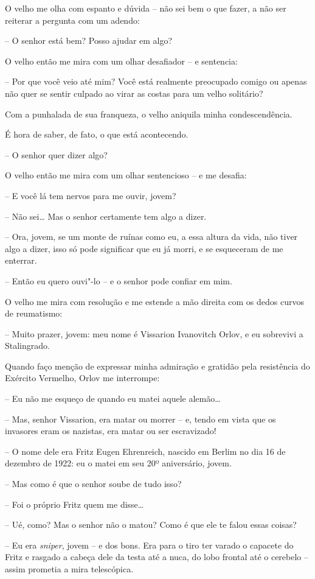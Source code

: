 O velho me olha com espanto e dúvida -- não sei bem o que fazer, a não
ser reiterar a pergunta com um adendo:

-- O senhor está bem? Posso ajudar em algo?

O velho então me mira com um olhar desafiador -- e sentencia:

-- Por que você veio até mim? Você está realmente preocupado comigo ou
apenas não quer se sentir culpado ao virar as costas para um velho
solitário?

Com a punhalada de sua franqueza, o velho aniquila minha
condescendência.

É hora de saber, de fato, o que está acontecendo.

-- O senhor quer dizer algo?

O velho então me mira com um olhar sentencioso -- e me desafia:

-- E você lá tem nervos para me ouvir, jovem?

-- Não sei\ldots{} Mas o senhor certamente tem algo a dizer.

-- Ora, jovem, se um monte de ruínas como eu, a essa altura da vida, não
tiver algo a dizer, isso só pode significar que eu já morri, e se
esqueceram de me enterrar.

-- Então eu quero ouvi"-lo -- e o senhor pode confiar em mim.

O velho me mira com resolução e me estende a mão direita com os dedos
curvos de reumatismo:

-- Muito prazer, jovem: meu nome é Vissarion Ivanovitch Orlov, e eu
sobrevivi a Stalingrado.

Quando faço menção de expressar minha admiração e gratidão pela
resistência do Exército Vermelho, Orlov me interrompe:

-- Eu não me esqueço de quando eu matei aquele alemão\ldots{}

-- Mas, senhor Vissarion, era matar ou morrer -- e, tendo em vista que
os invasores eram os nazistas, era matar ou ser escravizado!

-- O nome dele era Fritz Eugen Ehrenreich, nascido em Berlim no dia 16
de dezembro de 1922: eu o matei em seu 20º aniversário, jovem.

-- Mas como é que o senhor soube de tudo isso?

-- Foi o próprio Fritz quem me disse\ldots{}

-- Ué, como? Mas o senhor não o matou? Como é que ele te falou essas
coisas?

-- Eu era \emph{sniper}, jovem -- e dos bons. Era para o tiro ter varado
o capacete do Fritz e rasgado a cabeça dele da testa até a nuca, do lobo
frontal até o cerebelo -- assim prometia a mira telescópica.

